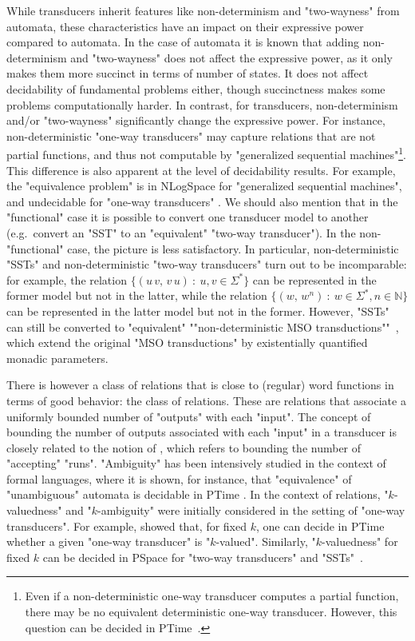 \documentclass{theoretics}
\begin{document}
While transducers inherit features like
non-determinism and "two-wayness" from automata,
these characteristics have an
impact on their expressive power compared to automata. 
In the case of automata it is known that adding non-determinism and 
"two-wayness" does not affect the expressive power,
as it only makes them more succinct in terms of number of states.
It does not affect decidability of fundamental problems either,
though succinctness makes some problems 
computationally harder. 
In contrast, for transducers, non-determinism 
and/or "two-wayness"
significantly  change the expressive power.
For instance, non-deterministic "one-way transducers" may capture 
relations that are not partial functions,
and thus not computable by "generalized sequential machines"\footnote{Even if a
non-deterministic one-way transducer computes a partial function, there may be
no equivalent deterministic one-way transducer. However, this question can be decided in {\upshape\sc PTime}~\cite{BealC02,AllauzenM03}.}.
This difference is also apparent at the level of decidability results. 
For example, the "equivalence problem" is in {\upshape\sc NLogSpace}
for "generalized sequential machines",
and undecidable for "one-way transducers" \cite{FischerR68,iba78siam,many_facets}.
We should also mention that in the "functional" case it is 
possible to convert one transducer model to another
(e.g.~convert an "SST" to an "equivalent" "two-way transducer").
In the non-"functional" case, the picture is less satisfactory.
In particular, non-deterministic "SSTs" and non-deterministic 
"two-way transducers" turn out to be incomparable:
for example, the relation
$\{(u\,v, \, v\,u) \::\: u,v\in\Sigma^*\}$ can be represented 
in the former model but not in the latter, while the relation
$\{(w, \, w^n) \::\: w\in\Sigma^*, n\in\mathbb{N}\}$ can be
represented in the latter model but not in the former.
\AP
However, "SSTs" can still be converted to "equivalent"
""non-deterministic MSO transductions""~\cite{DBLP:conf/icalp/AlurD11}, 
which extend the original "MSO transductions" 
by existentially quantified monadic parameters.


\AP
There is however a class of relations that is close
to (regular) word functions in terms of good behavior: 
the class of  relations.
These are relations that associate a uniformly bounded
number of "outputs" with each "input".
\AP
The concept of bounding the number of outputs associated 
with each "input" in a transducer is closely related to 
the notion of  , which refers to bounding the number of "accepting" "runs".
 "Ambiguity" has been intensively studied 
in the context of formal languages, where it is shown,
for instance, that "equivalence" of "unambiguous"
automata is decidable in {\upshape\sc PTime} \cite{Stearns1985OnTE}.
In the context of relations, "$k$-valuedness" and "$k$-ambiguity"
were initially considered in the setting of "one-way transducers". 
For example, \cite{GI83} showed that, for fixed $k$,
one can decide in {\upshape\sc PTime} whether a given "one-way transducer"
is "$k$-valued". Similarly, "$k$-valuedness" for fixed $k$ can be decided
in {\upshape\sc PSpace} for "two-way transducers" and "SSTs"~\cite{DBLP:conf/icalp/AlurD11}.
\end{document}
